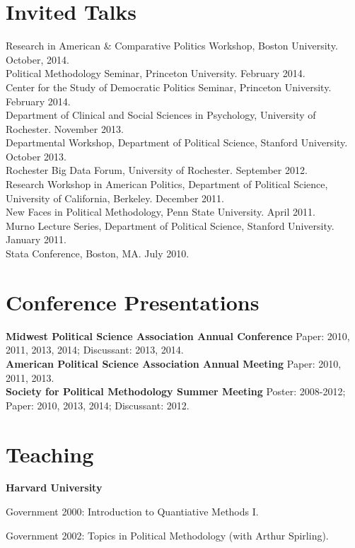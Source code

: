 \documentclass[margin,line]{res}
\newenvironment{list1}{
  \begin{list}{\ding{113}}{%
      \setlength{\itemsep}{0in}
      \setlength{\parsep}{0in} \setlength{\parskip}{0in}
      \setlength{\topsep}{0in} \setlength{\partopsep}{0in} 
      \setlength{\leftmargin}{0.83 cm}}}{\end{list}}
\begin{document}
\begin{resume}
\section{\textsf{\sc Invited Talks}}

Research in American \& Comparative Politics Workshop, Boston University. October, 2014.\\
Political Methodology Seminar, Princeton University. February 2014. \\
Center for the Study of Democratic Politics Seminar, Princeton University. February 2014.\\
Department of Clinical and Social Sciences in Psychology, University of Rochester. November 2013.\\
Departmental Workshop, Department of Political Science, Stanford University. October 2013.\\
Rochester Big Data Forum, University of Rochester. September 2012.\\
Research Workshop in American Politics, Department of Political Science, University of California, Berkeley. December 2011.\\
New Faces in Political Methodology, Penn State University. April 2011. \\
Murno Lecture Series, Department of Political Science, Stanford University. January 2011. \\
Stata Conference, Boston, MA. July 2010.

\section{\textsf{\sc Conference Presentations}}
{\bf Midwest Political Science Association Annual Conference} Paper: 2010, 2011, 2013, 2014; Discussant: 2013, 2014.\\
{\bf American Political Science Association Annual Meeting} Paper: 2010, 2011, 2013.\\
{\bf Society for Political Methodology Summer Meeting} Poster: 2008-2012; Paper: 2010, 2013, 2014; Discussant: 2012.\\

\section{\textsf{\sc Teaching}}
{\bf Harvard University}
\begin{list1}
\item[] Government 2000: Introduction to Quantiative Methods I.
\item[] Government 2002: Topics in Political Methodology (with Arthur Spirling).
\end{list1}


\end{resume}
\end{document}
